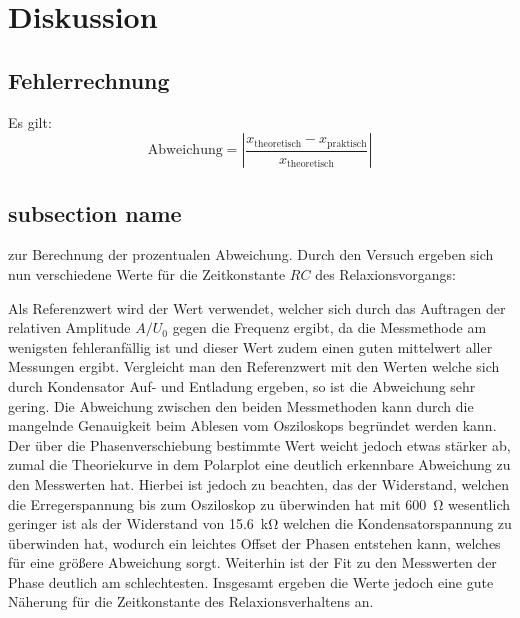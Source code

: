 \section{Diskussion}
\label{sec:Diskussion}
\subsection{Fehlerrechnung}
Es gilt:
\begin{equation}
  \text{Abweichung} = \left|\frac{x_\text{theoretisch}-x_\text{praktisch}}{x_\text{theoretisch}}\right|
  \label{eqn:abweichung}
\end{equation}
\subsection{subsection name}
zur Berechnung der prozentualen Abweichung.
Durch den Versuch ergeben sich nun verschiedene Werte für die
Zeitkonstante $RC$ des Relaxionsvorgangs:

Als Referenzwert wird der Wert verwendet, welcher
sich durch das Auftragen der relativen Amplitude $A/U_0$ gegen die
Frequenz ergibt, da die Messmethode am wenigsten fehleranfällig ist
und dieser Wert zudem einen guten mittelwert aller Messungen ergibt.
Vergleicht man den Referenzwert mit den Werten welche sich durch
Kondensator Auf- und Entladung ergeben, so ist die Abweichung sehr gering.
Die Abweichung zwischen den beiden Messmethoden kann durch die
mangelnde Genauigkeit beim Ablesen vom Osziloskops begründet werden kann.
Der über die Phasenverschiebung bestimmte Wert weicht jedoch etwas
stärker ab, zumal die Theoriekurve in dem Polarplot eine deutlich
erkennbare Abweichung zu den Messwerten hat.
Hierbei ist jedoch zu beachten, das der Widerstand, welchen die
Erregerspannung bis zum Osziloskop zu überwinden hat mit \SI{600}{\ohm}
wesentlich geringer ist als der Widerstand von \SI{15.6}{\kilo\ohm}
welchen die Kondensatorspannung zu überwinden hat, wodurch ein leichtes
Offset der Phasen entstehen kann, welches für eine größere Abweichung sorgt.
Weiterhin ist der Fit zu den Messwerten der Phase deutlich am schlechtesten.
Insgesamt ergeben die Werte jedoch eine gute Näherung für die Zeitkonstante
des Relaxionsverhaltens an.
